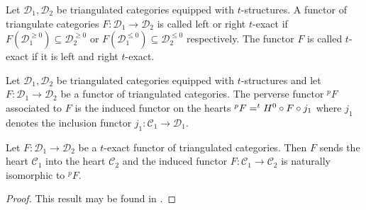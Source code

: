 \begin{definition}
 Let $\mathcal{D}_1,\mathcal{D}_2$ be triangulated categories equipped with $t$-structures. A functor of triangulate categories $F:\mathcal{D}_1\to \mathcal{D}_2$ is called left or right $t$-exact if $F(\mathcal{D}_1^{\geq 0}) \subseteq \mathcal{D}_2^{\geq 0}$ or $F(\mathcal{D}_1^{\leq 0}) \subseteq \mathcal{D}_2^{\leq 0}$ respectively.
 The functor $F$ is called $t$-exact if it is left and right $t$-exact.
\end{definition}
\begin{definition}
 Let $\mathcal{D}_1,\mathcal{D}_2$ be triangulated categories equipped with $t$-structures and let $F:\mathcal{D}_1 \to \mathcal{D}_2$ be a functor of triangulated categories.
 The perverse functor $^pF$ associated to $F$ is the induced functor on the hearts $^pF = ^tH^0 \circ F \circ j_1$ where $j_1$ denotes the inclusion functor $j_1:\mathcal{C}_1\to \mathcal{D}_1$.
\end{definition}
\begin{proposition}\label{prop: FunctorHeart}
  Let $F:\mathcal{D}_1 \to \mathcal{D}_2$ be a $t$-exact functor of triangulated categories. Then $F$ sends the heart $\mathcal{C}_1$ into the heart $\mathcal{C}_2$ and the induced functor $F:\mathcal{C}_1 \to \mathcal{C}_2$ is naturally isomorphic to $^pF$.
\end{proposition}
\begin{proof}
  This result may be found in \cite[Chapter 5]{dimca2004sheaves}.
\end{proof}
